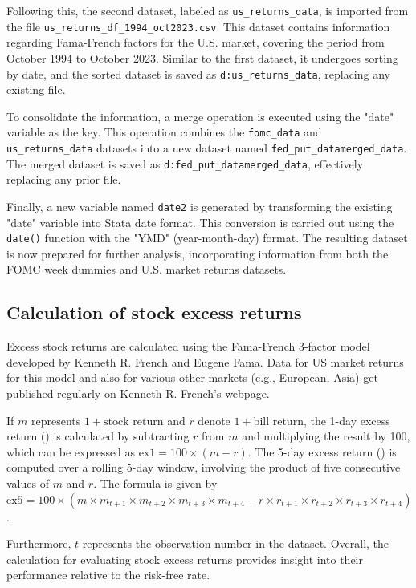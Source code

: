 Following this, the second dataset, labeled as \texttt{us\_returns\_data}, is imported from the file \texttt{us\_returns\_df\_1994\_oct2023.csv}. This dataset contains information regarding Fama-French factors for the U.S. market, covering the period from October 1994 to October 2023. Similar to the first dataset, it undergoes sorting by date, and the sorted dataset is saved as \texttt{d:us\_returns\_data}, replacing any existing file.

To consolidate the information, a merge operation is executed using the "date" variable as the key. This operation combines the \texttt{fomc\_data} and \texttt{us\_returns\_data} datasets into a new dataset named \texttt{fed\_put\_datamerged\_data}. The merged dataset is saved as \texttt{d:fed\_put\_datamerged\_data}, effectively replacing any prior file.

Finally, a new variable named \texttt{date2} is generated by transforming the existing "date" variable into Stata date format. This conversion is carried out using the \texttt{date()} function with the "YMD" (year-month-day) format. The resulting dataset is now prepared for further analysis, incorporating information from both the FOMC week dummies and U.S. market returns datasets.

\subsection{Calculation of stock excess returns}

Excess stock returns are calculated using the Fama-French 3-factor model developed by Kenneth R. French and Eugene Fama.  
Data for US market returns for this model and also for various other markets (e.g., European, Asia) get published regularly on Kenneth R. French's webpage. \parencite{kenneth_r_kenneth_nodate}

If \(m\) represents \(1 + \text{{stock return}}\) and \(r\) denote \(1 + \text{{bill return}}\), the 1-day excess return () is calculated by subtracting \(r\) from \(m\) and multiplying the result by 100, which can be expressed as \(\text{{ex1}} = 100 \times (m - r)\). The 5-day excess return () is computed over a rolling 5-day window, involving the product of five consecutive values of \(m\) and \(r\). The formula is given by \(\text{{ex5}} = 100 \times (m \times m_{t+1} \times m_{t+2} \times m_{t+3} \times m_{t+4} - r \times r_{t+1} \times r_{t+2} \times r_{t+3} \times r_{t+4})\).

Furthermore, \(t\) represents the observation number in the dataset. 
Overall, the calculation for evaluating stock excess returns provides insight into their 
performance relative to the risk-free rate.

